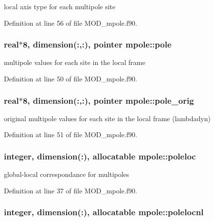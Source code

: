 local axis type for each multipole site 



Definition at line 56 of file M\-O\-D\-\_\-mpole.\-f90.

\hypertarget{classmpole_ab3bb649ea8ab60b38951d7ca48d75402}{
\subsubsection[{pole}]{\setlength{\rightskip}{0pt plus 5cm}real$\ast$8, dimension(\-:,\-:), pointer mpole\-::pole}}\label{classmpole_ab3bb649ea8ab60b38951d7ca48d75402}


multipole values for each site in the local frame 



Definition at line 50 of file M\-O\-D\-\_\-mpole.\-f90.

\hypertarget{classmpole_a3079f5a8f75081a85977a93e0a98f038}{
\subsubsection[{pole\-\_\-orig}]{\setlength{\rightskip}{0pt plus 5cm}real$\ast$8, dimension(\-:,\-:), pointer mpole\-::pole\-\_\-orig}}\label{classmpole_a3079f5a8f75081a85977a93e0a98f038}


original multipole values for each site in the local frame (lambdadyn) 



Definition at line 51 of file M\-O\-D\-\_\-mpole.\-f90.

\hypertarget{classmpole_ae846a620754e15482da112bf82192018}{
\subsubsection[{poleloc}]{\setlength{\rightskip}{0pt plus 5cm}integer, dimension(\-:), allocatable mpole\-::poleloc}}\label{classmpole_ae846a620754e15482da112bf82192018}


global-\/local correspondance for multipoles 



Definition at line 37 of file M\-O\-D\-\_\-mpole.\-f90.

\hypertarget{classmpole_a6e9bb6e7c48dd3b2622a3a3ed88f0cb9}{
\subsubsection[{polelocnl}]{\setlength{\rightskip}{0pt plus 5cm}integer, dimension(\-:), allocatable mpole\-::polelocnl}}\label{classmpole_a6e9bb6e7c48dd3b2622a3a3ed88f0cb9}


